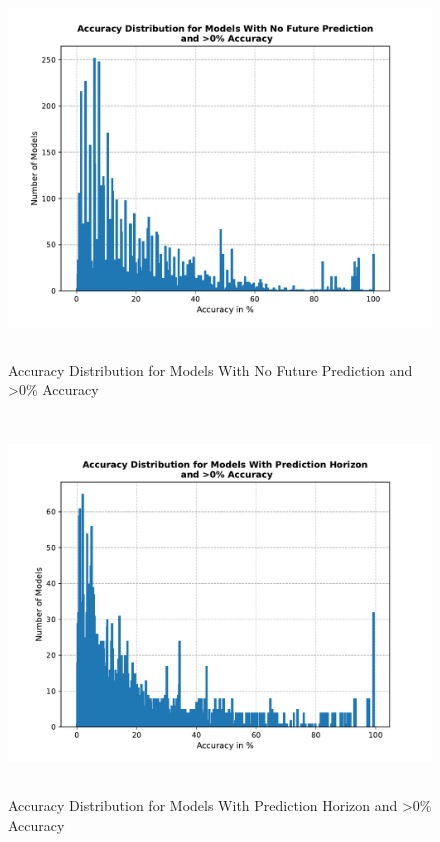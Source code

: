   \begin{figure}[htbp]
    \centering
    \includegraphics[height=10cm]{plots/nofuture.pdf}
    \caption{Accuracy Distribution for Models With No Future Prediction and >0\% Accuracy}
    \label{fig:nofuture}
  \end{figure}

  \begin{figure}[htbp]
    \centering
    \includegraphics[height=10cm]{plots/predhor.pdf}
    \caption{Accuracy Distribution for Models With Prediction Horizon and >0\% Accuracy}
    \label{fig:predhor}
  \end{figure}

